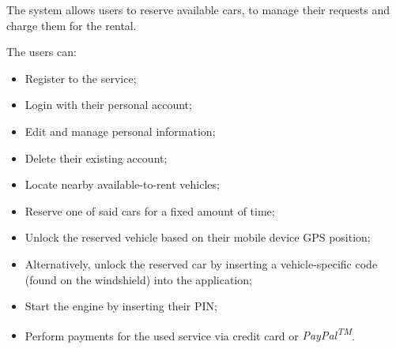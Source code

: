 The system allows users to reserve available cars, to manage their requests and charge them for the rental.

The users can:
\begin{itemize}
\item Register to the service;
\item Login with their personal account;
\item Edit and manage personal information;
\item Delete their existing account;
\item Locate nearby available-to-rent vehicles;
\item Reserve one of said cars for a fixed amount of time;
\item Unlock the reserved vehicle based on their mobile device GPS position;
\item Alternatively, unlock the reserved car by inserting a vehicle-specific code (found on the windshield) into the application;
\item Start the engine by inserting their PIN;
\item Perform payments for the used service via credit card or \emph{PayPal\textsuperscript{TM}}.
\end{itemize}